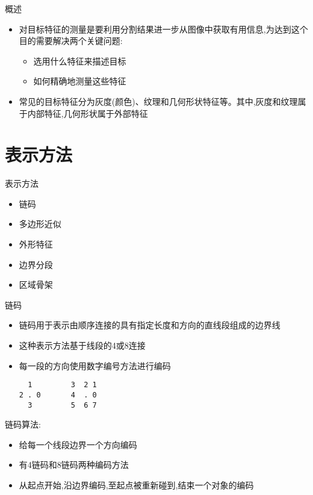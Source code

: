 \documentclass[presentation]{beamer}
\begin{document}
\begin{frame}[label={sec:org49ded43}]{概述}
\begin{itemize}
\item 对目标特征的测量是要利用分割结果进一步从图像中获取有用信息,为达到这个目的需要解决两个关键问题:
\begin{itemize}
\item 选用什么特征来描述目标
\item 如何精确地测量这些特征
\end{itemize}
\item 常见的目标特征分为灰度(颜色)、纹理和几何形状特征等。其中,灰度和纹理属于内部特征,几何形状属于外部特征
\end{itemize}
\end{frame}

\section{表示方法}
\label{sec:org48fca30}
\begin{frame}[label={sec:orgcad7e65}]{表示方法}
\begin{itemize}
\item 链码
\item 多边形近似
\item 外形特征
\item 边界分段
\item 区域骨架
\end{itemize}
\end{frame}

\begin{frame}[label={sec:org12a65f0},fragile]{链码}
 \begin{itemize}
\item 链码用于表示由顺序连接的具有指定长度和方向的直线段组成的边界线
\item 这种表示方法基于线段的4或8连接
\item 每一段的方向使用数字编号方法进行编码
\begin{verbatim}
  1         3  2 1
2 . 0       4  . 0
  3         5  6 7
\end{verbatim}
\end{itemize}
\end{frame}

\begin{frame}[label={sec:orgb7426ca}]{链码算法:}
\begin{itemize}
\item 给每一个线段边界一个方向编码
\item 有4链码和8链码两种编码方法
\item 从起点开始,沿边界编码,至起点被重新碰到,结束一个对象的编码
\end{itemize}
\end{frame}
\end{document}
